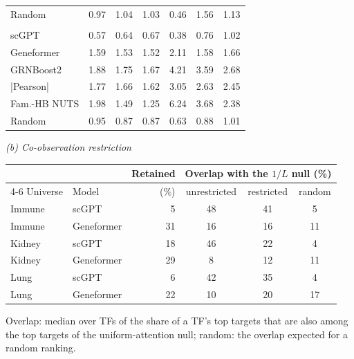 \begin{table}[htbp]
{\begin{tabular}{@{}lcccccc@{}}
Random & 0.97 & 1.04 & 1.03 & 0.46 & 1.56 & 1.13 \\
\addlinespace[3pt]
\multicolumn{7}{@{}l}{\emph{Lung}} \\
scGPT & 0.57 & 0.64 & 0.67 & 0.38 & 0.76 & 1.02 \\
Geneformer & 1.59 & 1.53 & 1.52 & 2.11 & 1.58 & 1.66 \\
GRNBoost2 & 1.88 & 1.75 & 1.67 & 4.21 & 3.59 & 2.68 \\
|Pearson| & 1.77 & 1.66 & 1.62 & 3.05 & 2.63 & 2.45 \\
Fam.-HB NUTS & 1.98 & 1.49 & 1.25 & 6.24 & 3.68 & 2.38 \\
Random & 0.95 & 0.87 & 0.87 & 0.63 & 0.88 & 1.01 \\
\bottomrule
\end{tabular}
}
\par\medskip
{
\footnotesize
\setlength{\tabcolsep}{5pt}
\par\noindent\emph{(b) Co-observation restriction}\par\smallskip
\begin{tabular}{@{}llrccc@{}}
\toprule
 & & Retained & \multicolumn{3}{c}{Overlap with the $1/L$ null (\%)} \\
\cmidrule(lr){4-6}
Universe & Model & (\%) & unrestricted & restricted & random \\
\midrule
Immune & scGPT & 5 & 48 & 41 & 5 \\
Immune & Geneformer & 31 & 16 & 16 & 11 \\
Kidney & scGPT & 18 & 46 & 22 & 4 \\
Kidney & Geneformer & 29 & 8 & 12 & 11 \\
Lung & scGPT & 6 & 42 & 35 & 4 \\
Lung & Geneformer & 22 & 10 & 20 & 17 \\
\bottomrule
\end{tabular}
}
\par\smallskip
\begin{minipage}{\linewidth}\footnotesize
Overlap: median over TFs of the share of a TF's top targets that are also among the top targets of the uniform-attention null; random: the overlap expected for a random ranking.
\end{minipage}
\end{table}
